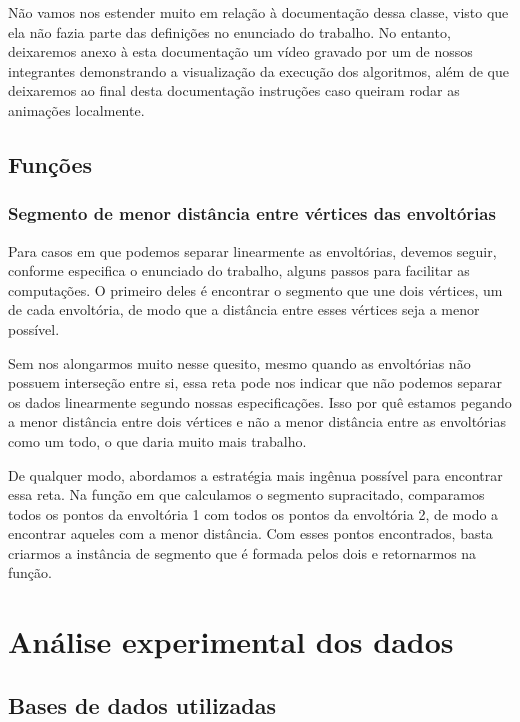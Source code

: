 \documentclass{article}
\begin{document}
Não vamos nos estender muito em relação à documentação dessa classe, visto que ela não fazia parte das definições no enunciado do trabalho. No entanto, deixaremos anexo à esta documentação um vídeo gravado por um de nossos integrantes demonstrando a visualização da execução dos algoritmos, além de que deixaremos ao final desta documentação instruções caso queiram rodar as animações localmente.

\subsection{Funções}

\subsubsection{Segmento de menor distância entre vértices das envoltórias}

Para casos em que podemos separar linearmente as envoltórias, devemos seguir, conforme especifica o enunciado do trabalho, alguns passos para facilitar as computações. O primeiro deles é encontrar o segmento que une dois vértices, um de cada envoltória, de modo que a distância entre esses vértices seja a menor possível.

Sem nos alongarmos muito nesse quesito, mesmo quando as envoltórias não possuem interseção entre si, essa reta pode nos indicar que não podemos separar os dados linearmente segundo nossas especificações. Isso por quê estamos pegando a menor distância entre dois vértices e não a menor distância entre as envoltórias como um todo, o que daria muito mais trabalho.

De qualquer modo, abordamos a estratégia mais ingênua possível para encontrar essa reta. Na função em que calculamos o segmento supracitado, comparamos todos os pontos da envoltória 1 com todos os pontos da envoltória 2, de modo a encontrar aqueles com a menor distância. Com esses pontos encontrados, basta criarmos a instância de segmento que é formada pelos dois e retornarmos na função.

\section{Análise experimental dos dados}

\subsection{Bases de dados utilizadas}
\end{document}
